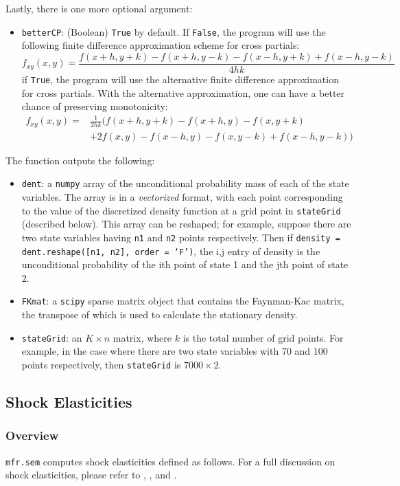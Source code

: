 \documentclass[12pt]{article}
\newcommand{\semProg}{mfr.sem\xspace}
\begin{document}
Lastly, there is  one more optional argument:
\begin{itemize}
    \item \texttt{betterCP}: (Boolean) \texttt{True} by default. If \texttt{False}, the program will use the following finite difference approximation scheme for cross partials:
    $$ f_{xy}(x,y) = \frac{f(x+h,y+k) - f(x+h,y-k) - f(x-h,y+k) + f(x-h,y-k)}{4hk} $$
    if \texttt{True}, the program will use the alternative finite difference approximation for cross partials. With the alternative approximation, one can have a better chance of preserving monotonicity:
\begin{align*}
f_{xy}(x,y) = & \frac{1}{2hk} \bigg(f(x+h,y+k) - f(x+h,y) - f(x,y+k) \\
					&+ 2f(x,y) - f(x-h,y) - f(x,y-k) + f(x-h,y-k)\bigg)
\end{align*}
\end{itemize}
The function outputs the following:
\begin{itemize}
\item \texttt{dent}: a \texttt{numpy} array of the unconditional probability mass of each of the state variables. The array is in a \textit{vectorized} format, with each point corresponding to the value of the discretized density function at a grid point in \texttt{stateGrid} (described below). This array can be reshaped; for example, suppose there are two state variables having \texttt{n1} and \texttt{n2} points respectively. Then if \texttt{density = dent.reshape([n1, n2], order = `F')}, the i,j entry of density is the unconditional probability of the ith point of state 1 and the jth point of state 2.
\item \texttt{FKmat}: a \texttt{scipy} sparse matrix object that contains the Faynman-Kac matrix, the transpose of which is used to calculate the stationary density.
\item \texttt{stateGrid}: an $K \times n$ matrix, where $k$ is the total number of grid points. For example, in the case where there are two state variables with 70 and 100 points respectively, then \texttt{stateGrid} is $7000 \times 2$.
\end{itemize}

\subsection{Shock Elasticities}\label{shockElasIntro}
\subsubsection{Overview}
\texttt{\semProg} computes shock elasticities defined as follows. For a full discussion on shock elasticities, please refer to \citet{Borovicka-Hansen-2016}, \citet{Borovicka-Hansen-Scheinkman-2014}, and \citet{Hansen-2012}. \\
\end{document}
